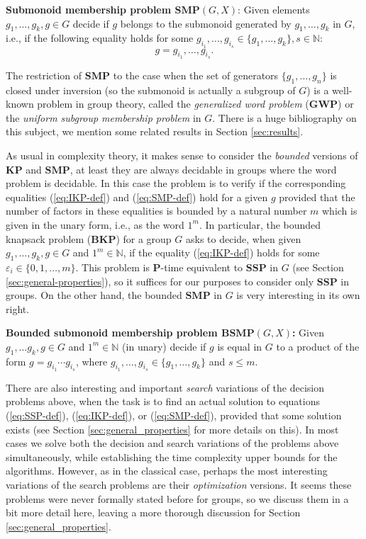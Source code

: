 \documentclass[11pt]{amsart}
\theoremstyle{definition}
\def\P{{\mathbf{P}}}
\def\SSP{{\mathbf{SSP}}}
\def\SMP{{\mathbf{SMP}}}
\def\BSMP{{\mathbf{BSMP}}}
\def\BKP{{\mathbf{BKP}}}
\def\KP{{\mathbf{KP}}}
\def\GWP{{\mathbf{GWP}}}
\begin{document}
\medskip
\noindent
{\bf Submonoid membership problem $\mathbf{SMP}(G,X)$\index{$\SMP(G,X)$}}:  Given elements $g_1,\ldots,g_k,g\in G$
decide if $g$ belongs to the submonoid generated by $g_1, \ldots, g_k$ in $G$, i.e., if the following equality holds for some $g_{i_1}, \ldots, g_{i_s} \in \{g_1, \ldots, g_k\}, s \in \mathbb{N}$:
\begin{equation}\label{eq:SMP-def}
g = g_{i_1}, \ldots, g_{i_s}.
\end{equation}

\medskip
The restriction of $\SMP$ to the case when the set of generators $\{g_1, \ldots,g_n\}$ is closed under inversion (so the submonoid is actually a subgroup of $G$) is  a well-known problem in group theory, called the {\em generalized word problem} ($\GWP$) or the {\em uniform subgroup membership problem} in $G$. There is a huge bibliography on this subject, we mention some related results  in Section \ref{sec:results}.

As usual in complexity theory, it makes sense to consider the {\em bounded} versions of $\KP$ and $\SMP$, at least they are always decidable in groups where the word problem is decidable. In this case the problem is to verify  if the corresponding equalities (\ref{eq:IKP-def}) and  (\ref{eq:SMP-def}) hold for a given $g$ provided that the number of factors in these equalities  is bounded by a natural number $m$ which is given in the unary form, i.e., as the word $1^m$. In particular, the bounded knapsack problem ($\BKP$) for a group $G$ asks to decide, when  given $g_1,\ldots,g_k,g\in G$ and $1^m\in\mathbb N$, if the equality (\ref{eq:IKP-def}) holds for some
$\varepsilon_i \in \{0,1, \ldots, m \}$.
This problem  is  $\P$-time equivalent to  $\SSP$ in $G$ (see Section \ref{sec:general-properties}), so it suffices for our purposes to consider only $\SSP$ in groups.
On the other hand,  the bounded $\SMP$ in $G$ is very interesting in its own right.


\medskip \noindent
{\bf Bounded submonoid membership problem $\BSMP(G,X)$\index{$\BSMP(G,X)$}:}
Given $g_1, \ldots g_k, g \in G$ and $1^m \in \mathbb{N}$ (in unary)
decide if $g$ is equal in $G$ to a product of the form
$g=g_{i_1}\cdots g_{i_s}$, where $g_{i_1}, \ldots, g_{i_s} \in \{g_1, \ldots, g_k\}$ and  $s\le m$.


\medskip
There are also  interesting and important {\it search} variations of the decision problems above,
when the task is to find an actual solution to equations (\ref{eq:SSP-def}), (\ref{eq:IKP-def}), or (\ref{eq:SMP-def}), provided that some solution  exists (see Section \ref{sec:general_properties} for more details on this). In most cases we solve both the decision and search variations of the problems above simultaneously, while establishing the time complexity upper bounds for the algorithms.  However, as in the classical case, perhaps the most interesting variations  of the search problems are their {\it optimization} versions. It seems these problems were never formally stated before for groups, so we discuss them in a bit more detail here, leaving a more thorough discussion for Section \ref{sec:general_properties}.
\end{document}
